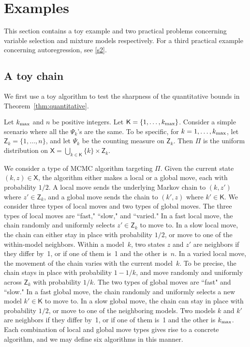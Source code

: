 \documentclass[12pt]{article}
\newcommand{\X}{\mathsf{X}}
\newcommand{\Z}{\mathsf{Z}}
\begin{document}
\section{Examples} \label{sec:examples}

This section contains a toy example and two practical problems concerning variable selection and mixture models respectively.
For a third practical example concerning autoregression, see \ref{s2}.

{
\subsection{A toy chain} \label{ssec:toy}
}

We first use a toy algorithm to test the sharpness of the quantitative bounds in Theorem~\ref{thm:quantitative}.


Let $k_{\scriptsize\mbox{max}}$ and $n$ be positive integers.
Let $\mathsf{K} = \{1,\dots,k_{\scriptsize\mbox{max}}\}$.
Consider a simple scenario where all the $\Psi_k$'s are the same.
To be specific, for $k = 1,\dots,k_{\scriptsize\mbox{max}}$, let $\Z_k = \{1,\dots,n\}$, and let $\Psi_k$ be the counting measure on $\Z_k$.
Then $\Pi$ is the uniform distribution on $\X = \bigcup_{k \in \mathsf{K}} \{k\} \times \Z_k$.

We consider a type of MCMC algorithm targeting $\Pi$.
Given the current state $(k,z) \in \X$, the algorithm either makes a local or a global move, each with probability $1/2$.
A local move sends the underlying Markov chain to $(k,z')$ where $z' \in \Z_k$, and a global move sends the chain to $(k',z)$ where $k' \in \mathsf{K}$.
We consider three types of local moves and two types of global moves.
The three types of local moves are ``fast," ``slow," and ``varied."
In a fast local move, the chain randomly and uniformly selects $z' \in \Z_k$ to move to.
In a slow local move, the chain can either stay in place with probability $1/2$, or move to one of the within-model neighbors.
Within a model~$k$, two states $z$ and $z'$ are neighbors if they differ by~1, or if one of them is~1 and the other is~$n$.
In a varied local move, the movement of the chain varies with the current model~$k$.
To be precise, the chain stays in place with probability $1-1/k$, and move randomly and uniformly across $\Z_k$ with probability $1/k$.
The two types of global moves are ``fast" and ``slow."
In a fast global move, the chain randomly and uniformly selects a new model $k' \in \mathsf{K}$ to move to.
In a slow global move, the chain can stay in place with probability $1/2$, or move to one of the neighboring models.
Two models $k$ and $k'$ are neighbors if they differ by~1, or if one of them is~1 and the other is $k_{\scriptsize\mbox{max}}$.
Each combination of local and global move types gives rise to a concrete algorithm, and we may define six algorithms in this manner.
\end{document}
